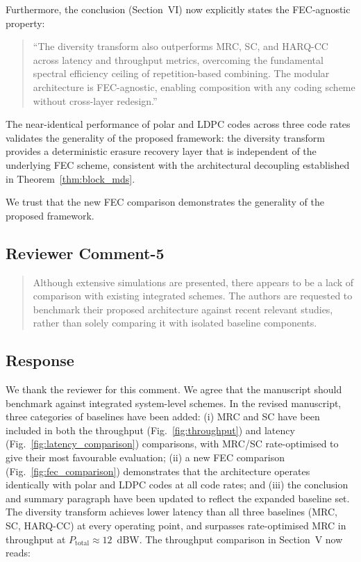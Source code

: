 Furthermore, the conclusion (Section~VI) now explicitly states the FEC-agnostic property:

\begin{quote}
``{\color{blue}The diversity transform also outperforms MRC, SC, and HARQ-CC across latency and throughput metrics, overcoming the fundamental spectral efficiency ceiling of repetition-based combining. The modular architecture is FEC-agnostic, enabling composition with any coding scheme without cross-layer redesign.}''
\end{quote}

The near-identical performance of polar and LDPC codes across three code rates validates the generality of the proposed framework: the diversity transform provides a deterministic erasure recovery layer that is independent of the underlying FEC scheme, consistent with the architectural decoupling established in Theorem~\ref{thm:block_mds}.

We trust that the new FEC comparison demonstrates the generality of the proposed framework.


\subsection{Reviewer Comment-5}



\begin{mdframed}
\begin{quote}
Although extensive simulations are presented, there appears to be a lack of comparison with existing integrated schemes. The authors are requested to benchmark their proposed architecture against recent relevant studies, rather than solely comparing it with isolated baseline components.

\end{quote}

\end{mdframed}


\subsection{Response}

We thank the reviewer for this comment. We agree that the manuscript should benchmark against integrated system-level schemes. In the revised manuscript, three categories of baselines have been added: (i) MRC and SC have been included in both the throughput (Fig.~\ref{fig:throughput}) and latency (Fig.~\ref{fig:latency_comparison}) comparisons, with MRC/SC rate-optimised to give their most favourable evaluation; (ii) a new FEC comparison (Fig.~\ref{fig:fec_comparison}) demonstrates that the architecture operates identically with polar and LDPC codes at all code rates; and (iii) the conclusion and summary paragraph have been updated to reflect the expanded baseline set. The diversity transform achieves lower latency than all three baselines (MRC, SC, HARQ-CC) at every operating point, and surpasses rate-optimised MRC in throughput at $P_{\mathrm{total}} \approx 12$~dBW. The throughput comparison in Section~V now reads:

